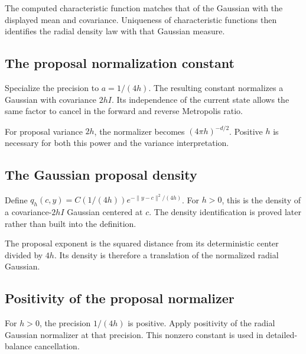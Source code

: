 \documentclass[11pt,a4paper]{report}
\begin{document}
The computed characteristic function matches that of the Gaussian with the displayed mean and covariance. Uniqueness of characteristic functions then identifies the radial density law with that Gaussian measure.

\subsection{\texorpdfstring{The proposal normalization constant}{The proposal normalization constant}}
\label{report-step-UnadjustedLangevin-GaussianProposalDensity-lean-12}


Specialize the precision to \(a=1/(4h)\). The resulting constant normalizes a Gaussian with covariance \(2hI\). Its independence of the current state allows the same factor to cancel in the forward and reverse Metropolis ratio.



For proposal variance \(2h\), the normalizer becomes \((4\pi h)^{-d/2}\). Positive \(h\) is necessary for both this power and the variance interpretation.

\subsection{\texorpdfstring{The Gaussian proposal density}{The Gaussian proposal density}}
\label{report-step-UnadjustedLangevin-GaussianProposalDensity-lean-13}


Define \(q_h(c,y)=C(1/(4h))e^{-\|y-c\|^2/(4h)}\). For \(h>0\), this is the density of a covariance-\(2hI\) Gaussian centered at \(c\). The density identification is proved later rather than built into the definition.



The proposal exponent is the squared distance from its deterministic center divided by \(4h\). Its density is therefore a translation of the normalized radial Gaussian.

\subsection{\texorpdfstring{Positivity of the proposal normalizer}{Positivity of the proposal normalizer}}
\label{report-step-UnadjustedLangevin-GaussianProposalDensity-lean-14}


For \(h>0\), the precision \(1/(4h)\) is positive. Apply positivity of the radial Gaussian normalizer at that precision. This nonzero constant is used in detailed-balance cancellation.
\end{document}
